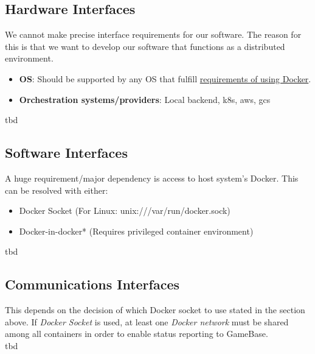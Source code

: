 \documentclass[a4paper,12pt,chapterprefix=false,bibliography=totoc,listof=totoc,]{scrreprt}
\begin{document}
\subsection{Hardware Interfaces}
We cannot make precise interface requirements for our software. The reason for this is that we want to develop our software that functions as a distributed environment.
\begin{itemize}
	\item \textbf{OS}: Should be supported by any OS that fulfill \href{https://www.docker.com/}{requirements of using Docker}.
	\item \textbf{Orchestration systems/providers}: Local backend, \gls{k8s}, \gls{aws}, \gls{gcs}
\end{itemize}
\gls{tbd}

\subsection{Software Interfaces}
A huge requirement/major dependency is access to host system's Docker. This can be resolved with either:
\begin{itemize}
	\item Docker Socket (For Linux: unix:///var/run/docker.sock)
	\item Docker-in-docker* (Requires privileged container environment)
\end{itemize}
\gls{tbd}

\subsection{Communications Interfaces}
This depends on the decision of which Docker socket to use stated in the section above.
If \textit{Docker Socket} is used, at least one \textit{Docker network} must be shared among all containers in order to enable status reporting to GameBase. \\
\gls{tbd}
\end{document}
